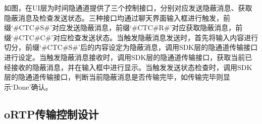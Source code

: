 
如图，在UI层为时间隐通道提供了三个控制接口，分别对应发送隐蔽消息、获取隐蔽消息及检查发送状态。三种接口均通过聊天界面输入框进行触发，前缀‘\#CTC\#S\#’对应发送隐蔽消息，前缀‘\#CTC\#R\#’对应获取隐蔽消息，前缀‘\#CTC\#C\#’对应检查发送状态。当触发隐蔽消息发送时，首先将输入内容进行切分，前缀‘\#CTC\#S\#’后的内容设定为隐蔽消息，调用SDK层的隐通道传输接口进行设定。当触发隐蔽消息接收时，调用SDK层的隐通道传输接口，获取当前已经接收的隐蔽消息，并在输入框中进行显示。当触发发送状态检查时，调用SDK层的隐通道传输接口，判断当前隐蔽消息是否传输完毕，如传输完毕则显示‘Done’确认。

\subsection{oRTP传输控制设计}
\label{chap:linphone:designation:ortp}


